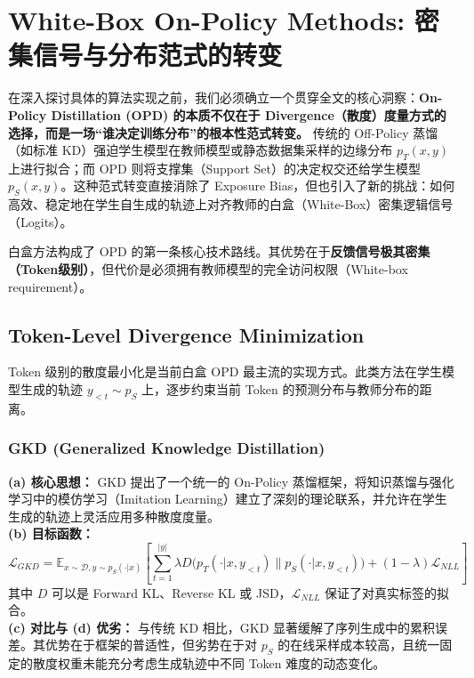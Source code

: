 \section{White-Box On-Policy Methods: 密集信号与分布范式的转变}
\label{sec:white_box}

在深入探讨具体的算法实现之前，我们必须确立一个贯穿全文的核心洞察：\textbf{On-Policy Distillation (OPD) 的本质不仅在于 Divergence（散度）度量方式的选择，而是一场“谁决定训练分布”的根本性范式转变。} 传统的 Off-Policy 蒸馏（如标准 KD）强迫学生模型在教师模型或静态数据集采样的边缘分布 $p_T(x, y)$ 上进行拟合；而 OPD 则将支撑集（Support Set）的决定权交还给学生模型 $p_S(x, y)$。这种范式转变直接消除了 Exposure Bias，但也引入了新的挑战：如何高效、稳定地在学生自生成的轨迹上对齐教师的白盒（White-Box）密集逻辑信号（Logits）。

白盒方法构成了 OPD 的第一条核心技术路线。其优势在于\textbf{反馈信号极其密集（Token级别）}，但代价是必须拥有教师模型的完全访问权限（White-box requirement）。

\subsection{Token-Level Divergence Minimization}
\label{subsec:token_level}

Token 级别的散度最小化是当前白盒 OPD 最主流的实现方式。此类方法在学生模型生成的轨迹 $y_{<t} \sim p_S$ 上，逐步约束当前 Token 的预测分布与教师分布的距离。

\subsubsection{GKD (Generalized Knowledge Distillation) \cite{agarwal2023gkd}}
\textbf{(a) 核心思想：} GKD 提出了一个统一的 On-Policy 蒸馏框架，将知识蒸馏与强化学习中的模仿学习（Imitation Learning）建立了深刻的理论联系，并允许在学生生成的轨迹上灵活应用多种散度度量。\\
\textbf{(b) 目标函数：}
\begin{equation}
    \mathcal{L}_{GKD} = \mathbb{E}_{x \sim \mathcal{D}, y \sim p_S(\cdot|x)} \left[ \sum_{t=1}^{|y|} \lambda D\big( p_T(\cdot|x, y_{<t}) \parallel p_S(\cdot|x, y_{<t}) \big) + (1-\lambda) \mathcal{L}_{NLL} \right]
\end{equation}
其中 $D$ 可以是 Forward KL、Reverse KL 或 JSD，$\mathcal{L}_{NLL}$ 保证了对真实标签的拟合。\\
\textbf{(c) 对比与 (d) 优劣：} 与传统 KD 相比，GKD 显著缓解了序列生成中的累积误差。其优势在于框架的普适性，但劣势在于对 $p_S$ 的在线采样成本较高，且统一固定的散度权重未能充分考虑生成轨迹中不同 Token 难度的动态变化。

